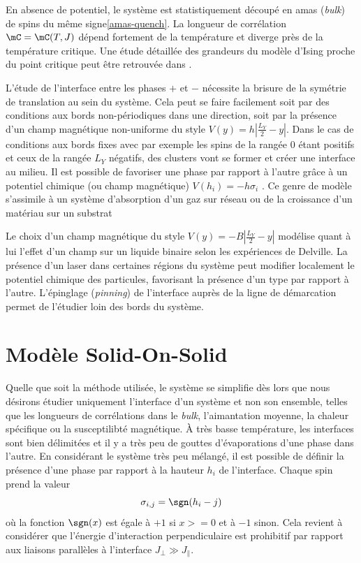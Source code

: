 En absence de potentiel, le système est statistiquement découpé en amas (\textit{bulk}) de spins du même signe\ref{amas-quench}. La longueur de corrélation   $\mC= \mC(T,J)$ dépend fortement de la température et diverge près de la température critique. Une étude détaillée des grandeurs du modèle d'Ising proche du point critique\cite{onsager,3d} peut être retrouvée dans \cite{these_david}.

L'étude de l'interface entre les phases $+$ et $-$ nécessite la brisure de la symétrie de translation au sein du système. Cela peut se faire facilement soit par des conditions aux bords non-périodiques dans une direction, soit  par la présence d'un champ magnétique non-uniforme du style $V(y) = h |\frac{L_Y}{2}-y|$. 
Dans le cas de conditions aux bords fixes avec par exemple les spins de la rangée $0$ étant positifs et ceux de la rangée $L_Y$ négatifs, des clusters vont se former et créer une interface au milieu. Il est possible de favoriser une phase par rapport à l'autre grâce à un potentiel chimique (ou champ magnétique) $V(h_i) = -h \sigma_i$ \cite{}. Ce genre de modèle s'assimile à un système d'absorption d'un gaz sur réseau\cite{} ou de la croissance d'un matériau sur un substrat\cite{}

Le choix d'un champ magnétique du style $V(y) = - B |\frac{L_Y}{2}-y|$ modélise quant à lui l'effet d'un champ  sur un liquide binaire selon les expériences de Delville\cite{}. La présence d'un laser dans certaines régions du système peut modifier localement le potentiel chimique des particules, favorisant la présence d'un type par rapport à l'autre. L'épinglage\cite{} (\textit{pinning}) de l'interface auprès de la ligne de démarcation permet de l'étudier loin des bords du système.

	\section{Modèle Solid-On-Solid}
		
Quelle que soit la méthode utilisée, le système se simplifie dès lors que nous désirons étudier uniquement l'interface d'un système et non son ensemble, telles que les longueurs de corrélations dans le \textit{bulk}, l'aimantation moyenne, la chaleur spécifique ou la susceptilibté magnétique. À très basse température, les interfaces sont bien délimitées et il y a très peu de gouttes d'évaporations d'une phase dans l'autre. En considérant le système très peu mélangé, il est possible de définir la présence d'une phase par rapport à la hauteur $h_i$ de l'interface. Chaque spin prend la valeur
\begin{equation*}
	\sigma_{i,j} = \sgn(h_i-j)
\end{equation*}
où la fonction $\sgn(x)$ est égale à $+1$ si $x>=0$ et à $-1$ sinon. Cela revient à considérer que l'énergie d'interaction perpendiculaire est prohibitif par rapport aux liaisons parallèles à l'interface $J_\perp \gg J_\parallel$. 

